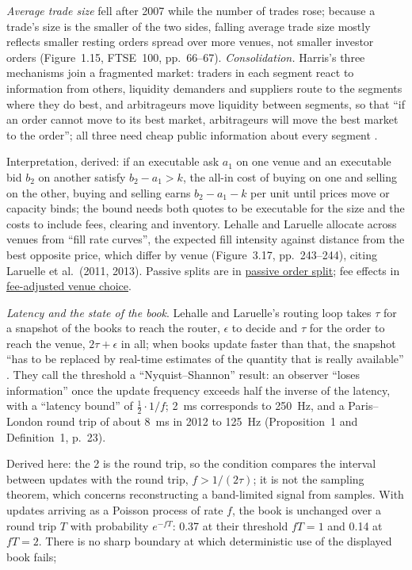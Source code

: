 \begin{qfdefinition}
\emph{Average trade size} fell after 2007 while the number of trades rose; because a trade's size is the smaller of the two sides, falling average trade size mostly reflects smaller resting orders spread over more venues, not smaller investor orders (Figure~1.15, FTSE~100, pp.~66--67). \emph{Consolidation.} Harris's three mechanisms join a fragmented market: traders in each segment react to information from others, liquidity demanders and suppliers route to the segments where they do best, and arbitrageurs move liquidity between segments, so that ``if an order cannot move to its best market, arbitrageurs will move the best market to the order''; all three need cheap public information about every segment \citep[chap.~26, sec.~26.4, pp.~533--534]{alpha-harris}.

Interpretation, derived: if an executable ask $a_1$ on one venue and an executable bid $b_2$ on another satisfy $b_2-a_1>k$, the all-in cost of buying on one and selling on the other, buying and selling earns $b_2-a_1-k$ per unit until prices move or capacity binds; the bound needs both quotes to be executable for the size and the costs to include fees, clearing and inventory. Lehalle and Laruelle allocate across venues from ``fill rate curves'', the expected fill intensity against distance from the best opposite price, which differ by venue (Figure~3.17, pp.~243--244), citing Laruelle et al.\ (2011, 2013). Passive splits are in \hyperref[meth:passive-order-split]{passive order split}; fee effects in \hyperref[res:fee-adjusted-venue-choice]{fee-adjusted venue choice}.

\emph{Latency and the state of the book}. Lehalle and Laruelle's routing loop takes $\tau$ for a snapshot of the books to reach the router, $\epsilon$ to decide and $\tau$ for the order to reach the venue, $2\tau+\epsilon$ in all; when books update faster than that, the snapshot ``has to be replaced by real-time estimates of the quantity that is really available'' \citep[Introduction, p.~22]{alpha-laruelle}. They call the threshold a ``Nyquist--Shannon'' result: an observer ``loses information'' once the update frequency exceeds half the inverse of the latency, with a ``latency bound'' of $\tfrac12\cdot1/f$; 2~ms corresponds to 250~Hz, and a Paris--London round trip of about 8~ms in 2012 to 125~Hz (Proposition~1 and Definition~1, p.~23).

Derived here: the 2 is the round trip, so the condition compares the interval between updates with the round trip, $f>1/(2\tau)$; it is not the sampling theorem, which concerns reconstructing a band-limited signal from samples. With updates arriving as a Poisson process of rate $f$, the book is unchanged over a round trip $T$ with probability $e^{-fT}$: 0.37 at their threshold $fT=1$ and 0.14 at $fT=2$. There is no sharp boundary at which deterministic use of the displayed book fails;


\end{qfdefinition}
